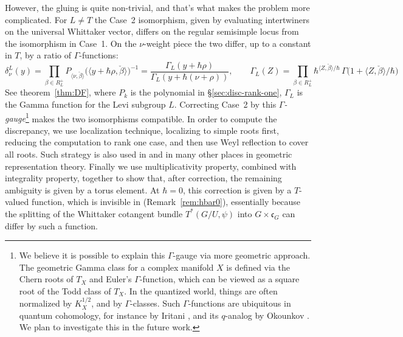\documentclass{article}
\theoremstyle{plain}
\theoremstyle{definition}
\theoremstyle{remark}
\numberwithin{equation}{section}
\begin{document}
However, the gluing is quite non-trivial, and that's what makes the problem more complicated. For $L\neq T$ the Case~2 isomorphism, given by evaluating intertwiners on the universal Whittaker vector, differs on the regular semisimple locus from the isomorphism in Case~1. On the $\nu$-weight piece the two differ, up to a constant in $T$, by a ratio of $\Gamma$-functions:
\[
\delta^L_\nu(y)=\prod_{\beta\in R_L^+}P_{\langle\nu,\check\beta\rangle}\bigl(\langle y+\hbar\rho,\check\beta\rangle\bigr)^{-1}
=\frac{\Gamma_L(y+\hbar\rho)}{\Gamma_L(y+\hbar(\nu+\rho))},\qquad
\Gamma_L(Z)=\prod_{\beta\in R^+_L}\hbar^{\langle Z,\check\beta\rangle/\hbar}\,\Gamma\bigl(1+\langle Z,\check\beta\rangle/\hbar\bigr)
\]
See theorem~\ref{thm:DF}, where $P_k$ is the polynomial in \S\ref{sec:disc-rank-one}, $\Gamma_L$ is the Gamma function for the Levi subgroup $L$. Correcting Case~2 by this \emph{$\Gamma$-gauge}\footnote{We believe it is possible to explain this $\Gamma$-gauge via more geometric approach. The geometric Gamma class for a complex manifold $X$ is defined via the Chern roots of $T_X$ and Euler's $\Gamma$-function, which can be viewed as a square root of the Todd class of $T_X$. In the quantized world, things are often normalized by $K_X^{1/2}$, and by $\Gamma$-classes. Such $\Gamma$-functions are ubiquitous in quantum cohomology, for instance by Iritani \cite{iritani2023gammaclassesquantumcohomology}, and its $q$-analog by Okounkov \cite{okounkov2017lecturesktheoreticcomputationsenumerative}. We plan to investigate this in the future work. } makes the two isomorphisms compatible. In order to compute the discrepancy, we use localization technique, localizing to simple roots first, reducing the computation to rank one case, and then use Weyl reflection to cover all roots. Such strategy is also used in \cite{bezrukavnikov2026equivariantsatakecategorykostantwhittaker} and in many other places in geometric representation theory. Finally we use multiplicativity property, combined with integrality property, together to show that, after correction, the remaining ambiguity is given by a torus element. At $\hbar=0$, this correction is given by a  $T$-valued function, which is invisible in \cite{macerato2023leviequivariantrestrictionsphericalperverse} (Remark~\ref{rem:hbar0}), essentially because the splitting of the Whittaker cotangent bundle $T^*(G/U,\psi)$ into $G\times \mathfrak c_G$ can differ by such a function.
\end{document}
